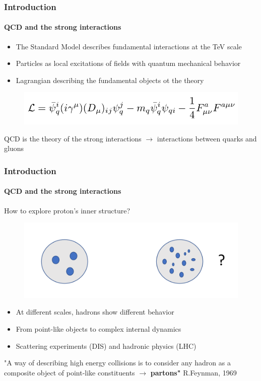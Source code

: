 \documentclass[aspectratio=43]{beamer}
\begin{document}
\begin{frame}

	\frametitle{Introduction}
	\framesubtitle{QCD and the strong interactions}
	
	\footnotesize
	
	\begin{itemize}
		\item The Standard Model describes fundamental interactions at the TeV scale
		\item Particles as local excitations of fields with quantum mechanical behavior
		\item Lagrangian describing the fundamental objects ot the theory
	\end{itemize}

	\begin{figure}
		\includegraphics[width = 0.5\linewidth]{plots/part1/intro/qcd_lagrangian.png}
	\end{figure}

		QCD is the theory of the strong interactions $\longrightarrow$ interactions between {\color{red} quarks and gluons}
		
\end{frame}

\begin{frame}

	\frametitle{Introduction}
	\framesubtitle{QCD and the strong interactions}
	
	\footnotesize
	
	How to explore proton's inner structure?

	\begin{figure}
		\includegraphics[width = 0.5\linewidth]{plots/part1/intro/protons.png}
	\end{figure}
	
	
	\begin{itemize}
		\item At different scales, hadrons show different behavior
		\item From point-like objects to complex internal dynamics
		\item Scattering experiments (DIS) and hadronic physics (LHC)
	\end{itemize}
	
	{\color{blue} \footnotesize "A way of describing high energy collisions is to consider any hadron as a composite object of point-like constituents $\longrightarrow$ \textbf{partons"} } R.Feynman, 1969 

\end{frame}
\end{document}
